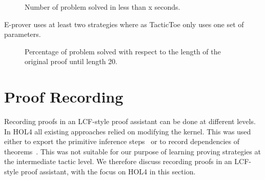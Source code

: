 \documentclass[runningheads,a4paper,draft]{svjour3}
\def\holfour{\textsf{HOL4}\xspace}
\def\eprover{\textsf{E-prover}\xspace}
\def\tactictoe{\textsf{TacticToe}\xspace}
\begin{document}
\begin{figure}[h]
\centering           
{}
\caption{Number of problem solved in less than x seconds.}
\end{figure}
\eprover uses at least two strategies where as \tactictoe only uses one set 
of parameters.


\begin{figure}[h]
\centering           
{}
\caption{Percentage of problem solved with respect to the length of the 
original proof until length 20.}
\end{figure}


% 

\section{Proof Recording}\label{sec:recording}

Recording proofs in an LCF-style proof assistant can be done at different 
levels.
In \holfour all existing approaches relied on modifying the kernel. This was 
used
either to export the primitive inference 
steps~\cite{Wong95recordingand,DBLP:conf/itp/KumarH12}
or to record dependencies of theorems~\cite{tgck-cpp15}. This was not suitable 
for our
purpose of learning proving strategies at the intermediate tactic level. We 
therefore
discuss recording proofs in an LCF-style proof assistant, with the focus on 
\holfour
in this section.
\end{document}
